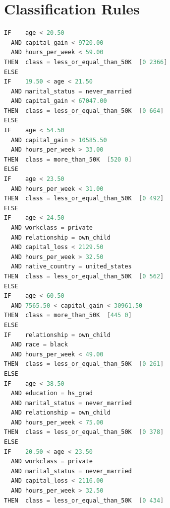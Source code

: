 \documentclass[a4paper]{llncs}
\begin{document}
\section{Classification Rules}
\begin{lstlisting}[language=c,frame=single,breaklines=true,basicstyle=\footnotesize\ttfamily,caption={Subset of the ordered set of rules induced by CN2 with the laplacian error estimation method},label=cn2_rules]
IF    age < 20.50
  AND capital_gain < 9720.00
  AND hours_per_week < 59.00
THEN  class = less_or_equal_than_50K  [0 2366]
ELSE
IF    19.50 < age < 21.50
  AND marital_status = never_married
  AND capital_gain < 67047.00
THEN  class = less_or_equal_than_50K  [0 664]
ELSE
IF    age < 54.50
  AND capital_gain > 10585.50
  AND hours_per_week > 33.00
THEN  class = more_than_50K  [520 0]
ELSE
IF    age < 23.50
  AND hours_per_week < 31.00
THEN  class = less_or_equal_than_50K  [0 492]
ELSE
IF    age < 24.50
  AND workclass = private
  AND relationship = own_child
  AND capital_loss < 2129.50
  AND hours_per_week > 32.50
  AND native_country = united_states
THEN  class = less_or_equal_than_50K  [0 562]
ELSE
IF    age < 60.50
  AND 7565.50 < capital_gain < 30961.50
THEN  class = more_than_50K  [445 0]
ELSE
IF    relationship = own_child
  AND race = black
  AND hours_per_week < 49.00
THEN  class = less_or_equal_than_50K  [0 261]
ELSE
IF    age < 38.50
  AND education = hs_grad
  AND marital_status = never_married
  AND relationship = own_child
  AND hours_per_week < 75.00
THEN  class = less_or_equal_than_50K  [0 378]
ELSE
IF    20.50 < age < 23.50
  AND workclass = private
  AND marital_status = never_married
  AND capital_loss < 2116.00
  AND hours_per_week > 32.50
THEN  class = less_or_equal_than_50K  [0 434]
\end{lstlisting}
\clearpage
\end{document}
